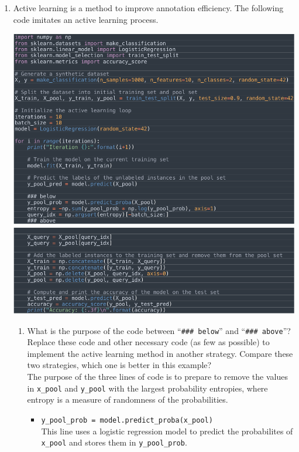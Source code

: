 \documentclass[conference]{IEEEtran}
\begin{document}
\begin{enumerate}
\newpage
\item Active learning is a method to improve annotation efficiency. The following code imitates an active learning process.
\begin{center}
\includegraphics[scale=0.25]{HW 02 code (1).png}
\includegraphics[scale=0.25]{HW 02 code (2).png}
\end{center}
\begin{enumerate}
\item What is the purpose of the code between “\verb"### below"” and “\verb"### above"”? Replace these code and other necessary code (as few as possible) to implement the active learning method in another strategy. Compare these two strategies, which one is better in this example?\\

The purpose of the three lines of code is to prepare to remove the values in \verb"x_pool" and \verb"y_pool" with the largest probability entropies, where entropy is a measure of randomness of the probabilities.
\begin{itemize}
\item \verb"y_pool_prob = model.predict_proba(x_pool)"\\
This line uses a logistic regression model to predict the probabilites of \verb"x_pool" and stores them in \verb"y_pool_prob".


\end{itemize}
\end{enumerate}
\end{enumerate}
\end{document}
